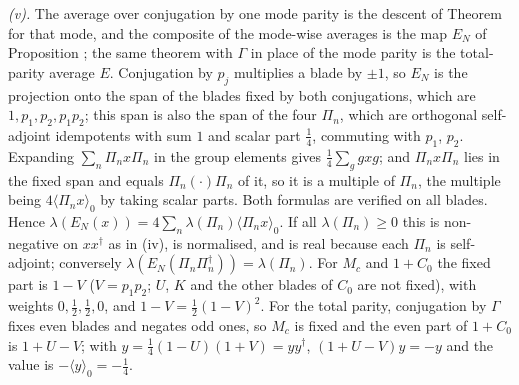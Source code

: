 \emph{(v).} The average over conjugation by one mode parity is the descent of Theorem  for that mode, and the composite of the mode-wise averages is the map $E_{N}$ of Proposition ; the same theorem with $\Gamma$ in place of the mode parity is the total-parity average $E$. Conjugation by $p_{j}$ multiplies a blade by $\pm 1$, so $E_{N}$ is the projection onto the span of the blades fixed by both conjugations, which are $1, p_{1}, p_{2}, p_{1}p_{2}$; this span is also the span of the four $\Pi_{n}$, which are orthogonal self-adjoint idempotents with sum $1$ and scalar part $\tfrac14$, commuting with $p_{1}$, $p_{2}$. Expanding $\sum_{n}\Pi_{n}x\Pi_{n}$ in the group elements gives $\tfrac14\sum_{g}gxg$; and $\Pi_{n}x\Pi_{n}$ lies in the fixed span and equals $\Pi_{n}(\cdot)\Pi_{n}$ of it, so it is a multiple of $\Pi_{n}$, the multiple being $4\langle\Pi_{n}x\rangle_{0}$ by taking scalar parts. Both formulas are verified on all blades. Hence $\lambda(E_{N}(x)) = 4\sum_{n}\lambda(\Pi_{n})\langle\Pi_{n}x\rangle_{0}$. If all $\lambda(\Pi_{n}) \ge 0$ this is non-negative on $xx^{\dagger}$ as in (iv), is normalised, and is real because each $\Pi_{n}$ is self-adjoint; conversely $\lambda(E_{N}(\Pi_{n}\Pi_{n}^{\dagger})) = \lambda(\Pi_{n})$. For $M_{c}$ and $1 + C_{0}$ the fixed part is $1 - V$ ($V = p_{1}p_{2}$; $U$, $K$ and the other blades of $C_{0}$ are not fixed), with weights $0, \tfrac12, \tfrac12, 0$, and $1 - V = \tfrac12(1 - V)^{2}$. For the total parity, conjugation by $\Gamma$ fixes even blades and negates odd ones, so $M_{c}$ is fixed and the even part of $1 + C_{0}$ is $1 + U - V$; with $y = \tfrac14(1 - U)(1 + V) = yy^{\dagger}$, $(1 + U - V)y = -y$ and the value is $-\langle y\rangle_{0} = -\tfrac14$.
